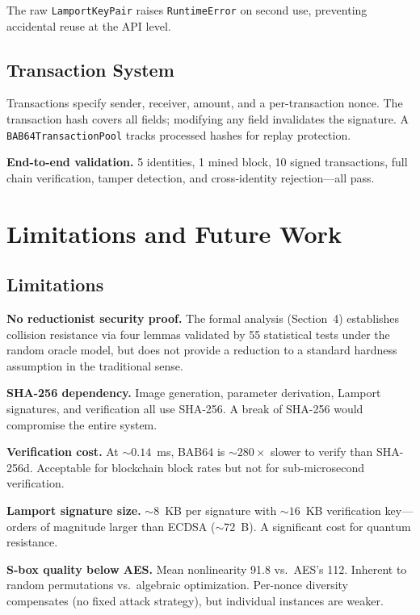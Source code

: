 \documentclass[preprint]{iacrtrans}
\begin{document}
The raw \texttt{LamportKeyPair} raises \texttt{RuntimeError} on second use, preventing accidental reuse at the API level.

\subsection{Transaction System}

Transactions specify sender, receiver, amount, and a per-transaction nonce. The transaction hash covers all fields; modifying any field invalidates the signature. A \texttt{BAB64TransactionPool} tracks processed hashes for replay protection.

\textbf{End-to-end validation.} 5 identities, 1 mined block, 10 signed transactions, full chain verification, tamper detection, and cross-identity rejection---all pass.

\section{Limitations and Future Work}

\subsection{Limitations}

\textbf{No reductionist security proof.} The formal analysis (Section~4) establishes collision resistance via four lemmas validated by 55 statistical tests under the random oracle model, but does not provide a reduction to a standard hardness assumption in the traditional sense.

\textbf{SHA-256 dependency.} Image generation, parameter derivation, Lamport signatures, and verification all use SHA-256. A break of SHA-256 would compromise the entire system.

\textbf{Verification cost.} At ${\sim}0.14$~ms, BAB64 is ${\sim}280\times$ slower to verify than SHA-256d. Acceptable for blockchain block rates but not for sub-microsecond verification.

\textbf{Lamport signature size.} ${\sim}8$~KB per signature with ${\sim}16$~KB verification key---orders of magnitude larger than ECDSA (${\sim}72$~B). A significant cost for quantum resistance.

\textbf{S-box quality below AES.} Mean nonlinearity 91.8 vs.\ AES's 112. Inherent to random permutations vs.\ algebraic optimization. Per-nonce diversity compensates (no fixed attack strategy), but individual instances are weaker.
\end{document}
